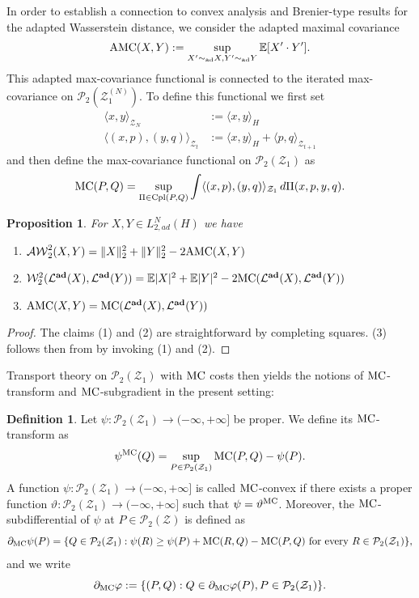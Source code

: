 \documentclass[a4paper]{amsart}
\numberwithin{theorem}{section}
\newtheorem{proposition}[theorem]{Proposition}
\theoremstyle{definition}
\newtheorem{definition}[theorem]{Definition}
\newcommand{\E}{\mathbb{E}}
\newcommand{\law}{\mathcal{L}}
\newcommand{\cpl}{\textup{Cpl}}
\newcommand{\W}{\mathcal{W}}
\newcommand{\AW}{\mathcal{AW}}
\newcommand{\Pc}{\mathcal P}
\newcommand{\simad}{\sim_{\mathrm{ad}}}
\renewcommand{\H}{H}
\renewcommand{\phi}{\varphi}
\newcommand{\mc}{\textup{MC}}
\newcommand{\Zc}{\mathcal{Z}}
\newcommand{\lawadd}{\law^{\textnormal{\textbf{ad}}}}
\newcommand{\AMC}{\textup{AMC}}
\begin{document}
In order to establish a connection to convex analysis and Brenier-type results for the adapted Wasserstein distance, we consider the adapted maximal covariance 
\begin{align*}
\AMC(X,Y) := \sup_{ X' \simad X, Y' \simad Y  }  \E[ X'  \cdot Y' ]. 
\end{align*}
This adapted max-covariance functional is connected to the iterated max-covariance on $\Pc_2(\Zc^{(N)}_1)$. To define this functional we first set
\begin{align*}
    \langle x,y \rangle_{\Zc_N} &:= \langle x,y \rangle_H \\
    \langle (x,p), (y,q) \rangle_{\Zc_t} &:= \langle x,y \rangle_H + \langle p, q \rangle_{\Zc_{t+1}}
\end{align*}
and then define the max-covariance functional on $\Pc_2(\Zc_1)$ as
\[
\mc(P,Q) = \sup_{\Pi \in \cpl(P,Q)} \int \langle (x,p), (y,q) \rangle_{\Zc_1} \, d\Pi(x,p,y,q).
\]
\begin{proposition}
For $X,Y \in L_{2,ad}^N(\H)$ we have 
\begin{enumerate}
    \item $\AW_2^2(X,Y) = \|X\|_2^2 + \|Y\|_2^2 - 2\AMC(X,Y) $
    \item $\W_2^2(\lawadd(X),\lawadd(Y)) = \E|X|^2 + \E|Y|^2 - 2\mc(\lawadd(X),\lawadd(Y)) $
    \item $\AMC(X,Y) = \mc(\lawadd(X),\lawadd(Y))$
     
\end{enumerate}
\end{proposition}

\begin{proof}
The claims (1) and (2) are straightforward by completing squares. (3) follows then from  by invoking (1) and (2).
\end{proof}

Transport theory on  $\Pc_2(\Zc_1)$ with $\mc$ costs then yields the notions of $\mc$-transform and $\mc$-subgradient in the present setting:
\begin{definition}\label{def:MC_subdiff_FP}
    Let $\psi : \Pc_2(\Zc_1) \to (-\infty,+\infty]$ be proper. We define its $\mc$-transform as 
    \[
        \psi^{\mc}(Q) = \sup_{ P \in \Pc_2(\Zc_1)}  \mc(P,Q) -  \psi(P). 
    \]
    A function $\psi : \Pc_2(\Zc_1) \to (-\infty,+\infty]$ is called $\mc$-convex if there exists a proper function $\vartheta : \Pc_2(\Zc_1) \to (-\infty,+\infty]$ such that $\psi = \vartheta^\mc$.
    Moreover, the $\mc$-subdifferential of $\psi$ at $P \in \Pc_2(\Zc)$ is defined as  
    \[
        \partial_{\mc} \psi(P) = \{ Q\in \Pc_2(\Zc_1) : \psi(R) \ge \psi(P) + \mc(R,Q) - \mc(P,Q) \text{ for every } R \in \Pc_2(\Zc_1)\},
    \]
    and we write
    \[
        \partial_\mc \phi := \{ (P,Q) : Q \in  \partial_{\mc} \phi(P), P \in \Pc_2(\Zc_1) \}. 
    \]
\end{definition}
\end{document}
